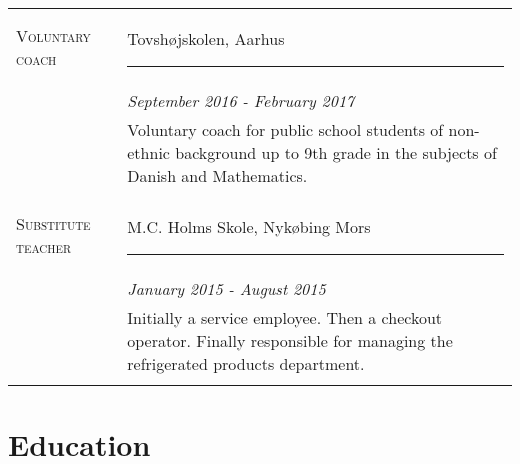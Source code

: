 \documentclass[letterpaper]{twentysecondcv} %
\begin{document}
\begin{tabular}{p{2.9cm} | p{9.6cm}}
\textsc{Voluntary coach} & {Tovshøjskolen, Aarhus \hrule} \\&\emph{\small{September 2016 - February 2017}}\\ [0.5mm]
&\small{
Voluntary coach for public school students of non-ethnic background
up to 9th grade in the subjects of Danish and Mathematics.
}\\\multicolumn{2}{c}{} \\

\textsc{Substitute teacher} & {M.C. Holms Skole, Nykøbing Mors \hrule} \\&\emph{\small{January 2015 - August 2015}}\\ [0.5mm]
&\small{
Initially a service employee. Then a checkout operator. Finally responsible for managing the refrigerated products department.
}\\\multicolumn{2}{c}{} \\
\end{tabular}

\newpage        %
\makeprofile    %

\section{Education}
\end{document}
